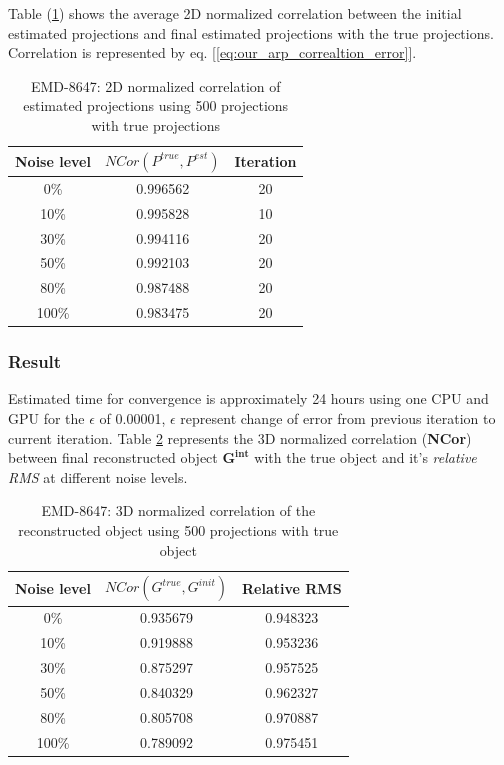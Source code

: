 \documentclass[twoside]{iitbreport}
\begin{document}
Table (\ref{tbl:our_shapr_8647_result-2d-correlation}) shows the average 2D normalized correlation between the initial estimated projections and final estimated projections with the true projections. Correlation is represented by eq. [\ref{eq:our_arp_correaltion_error}]. 

\begin{table}[H]
    \centering
     \begin{tabular}{||c c c ||} 
             \hline
             Noise level & $ NCor(P^{true},P^{est})$ &  Iteration \\
             \hline\hline
            0\%   &0.996562 & 20 \\ \hline
            10\%  &0.995828 & 10 \\ \hline
            30\%  &0.994116 & 20 \\ \hline
            50\%  &0.992103 & 20 \\ \hline
            80\%  &0.987488 & 20 \\ \hline
            100\% &0.983475 & 20 \\ \hline
            \hline
    \end{tabular}
    \caption{EMD-8647: 2D normalized correlation of estimated projections using 500 projections with true projections }
    \label{tbl:our_shapr_8647_result-2d-correlation}
\end{table}

\subsubsection{\textbf{Result}}

Estimated time for convergence is approximately 24 hours using one CPU and GPU for the $\epsilon$  of 0.00001, $\epsilon$ represent change of error from previous iteration to current iteration. Table \ref{tbl:our_sharp_8674_result-3d-correlation} represents the 3D normalized correlation (\textbf{NCor}) between final reconstructed object $\boldsymbol{G^{int}}$ with the true object and it's \textit{relative RMS} at different noise levels. 

\begin{table}[H]
    \centering
     \begin{tabular}{||c c c||} 
             \hline
             Noise level & $NCor(G^{true},G^{init})$  &  Relative RMS \\ 
             \hline\hline
            0\%   &0.935679 & 0.948323 \\\hline
            10\%  &0.919888 & 0.953236 \\\hline 
            30\%  &0.875297 & 0.957525 \\\hline
            50\%  &0.840329 & 0.962327 \\\hline
            80\%  &0.805708 & 0.970887 \\\hline
            100\% &0.789092 & 0.975451 \\\hline
             \hline
    \end{tabular}
    \captionsetup{justification=centering}
    \caption{EMD-8647: 3D normalized correlation of the reconstructed object using 500 projections with true object }
    \label{tbl:our_sharp_8674_result-3d-correlation}
\end{table}
\end{document}
